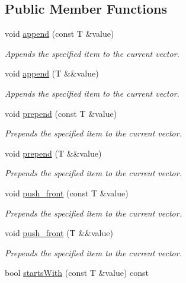 \subsection*{Public Member Functions}
\begin{DoxyCompactItemize}
\item 
void \mbox{\hyperlink{class_a_vector_ab998b222eb341c26f4eafd8da65f2274}{append}} (const T \&value)
\begin{DoxyCompactList}\small\item\em Appends the specified item to the current vector. \end{DoxyCompactList}\item 
void \mbox{\hyperlink{class_a_vector_aae594c91729d29605c2fe4a71cbf6f0c}{append}} (T \&\&value)
\begin{DoxyCompactList}\small\item\em Appends the specified item to the current vector. \end{DoxyCompactList}\item 
void \mbox{\hyperlink{class_a_vector_a5b7910c1c1dce6877a21f9c5cba4bfc2}{prepend}} (const T \&value)
\begin{DoxyCompactList}\small\item\em Prepends the specified item to the current vector. \end{DoxyCompactList}\item 
void \mbox{\hyperlink{class_a_vector_a13f40bde5b40222d98fe0982eaca9513}{prepend}} (T \&\&value)
\begin{DoxyCompactList}\small\item\em Prepends the specified item to the current vector. \end{DoxyCompactList}\item 
void \mbox{\hyperlink{class_a_vector_a18f64e22552d73fc4424dc81ba158216}{push\+\_\+front}} (const T \&value)
\begin{DoxyCompactList}\small\item\em Prepends the specified item to the current vector. \end{DoxyCompactList}\item 
void \mbox{\hyperlink{class_a_vector_a0050a46da378811f3ff5fc4df73ecd62}{push\+\_\+front}} (T \&\&value)
\begin{DoxyCompactList}\small\item\em Prepends the specified item to the current vector. \end{DoxyCompactList}\item 
bool \mbox{\hyperlink{class_a_vector_a7cc825790e29f58f9425fd11efbdbbab}{starts\+With}} (const T \&value) const

\end{DoxyCompactItemize}
